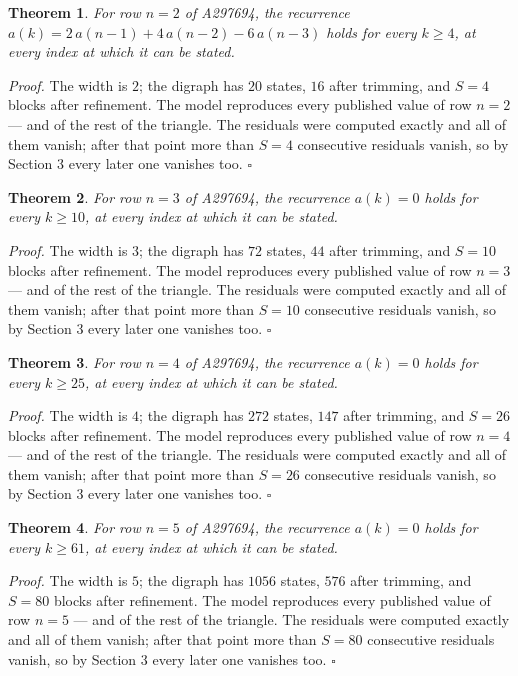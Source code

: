 \documentclass[11pt]{article}
\newtheorem{theorem}{Theorem}
\theoremstyle{definition}
\begin{document}
\begin{theorem} For row $n = 2$ of A297694, the recurrence $a(k) = 2\,a(n-1) + 4\,a(n-2) - 6\,a(n-3)$ holds for every $k \ge 4$, at every index at which it can be stated.\end{theorem}

{\itshape Proof.} The width is $2$; the digraph has $20$ states, $16$ after trimming, and $S = 4$ blocks after refinement. The model reproduces every published value of row $n = 2$ --- and of the rest of the triangle. The residuals were computed exactly and all of them vanish; after that point more than $S = 4$ consecutive residuals vanish, so by Section 3 every later one vanishes too. $\square$

\begin{theorem} For row $n = 3$ of A297694, the recurrence $a(k) = 0$ holds for every $k \ge 10$, at every index at which it can be stated.\end{theorem}

{\itshape Proof.} The width is $3$; the digraph has $72$ states, $44$ after trimming, and $S = 10$ blocks after refinement. The model reproduces every published value of row $n = 3$ --- and of the rest of the triangle. The residuals were computed exactly and all of them vanish; after that point more than $S = 10$ consecutive residuals vanish, so by Section 3 every later one vanishes too. $\square$

\begin{theorem} For row $n = 4$ of A297694, the recurrence $a(k) = 0$ holds for every $k \ge 25$, at every index at which it can be stated.\end{theorem}

{\itshape Proof.} The width is $4$; the digraph has $272$ states, $147$ after trimming, and $S = 26$ blocks after refinement. The model reproduces every published value of row $n = 4$ --- and of the rest of the triangle. The residuals were computed exactly and all of them vanish; after that point more than $S = 26$ consecutive residuals vanish, so by Section 3 every later one vanishes too. $\square$

\begin{theorem} For row $n = 5$ of A297694, the recurrence $a(k) = 0$ holds for every $k \ge 61$, at every index at which it can be stated.\end{theorem}

{\itshape Proof.} The width is $5$; the digraph has $1056$ states, $576$ after trimming, and $S = 80$ blocks after refinement. The model reproduces every published value of row $n = 5$ --- and of the rest of the triangle. The residuals were computed exactly and all of them vanish; after that point more than $S = 80$ consecutive residuals vanish, so by Section 3 every later one vanishes too. $\square$
\end{document}
